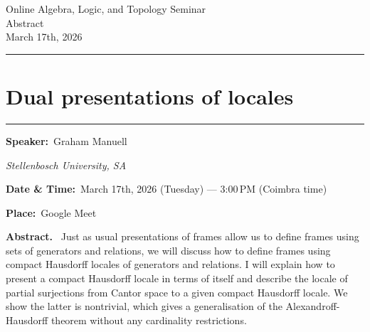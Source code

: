 \documentclass[11pt,a4paper]{article}
\newcommand{\Title}[1]{\section*{#1}\vspace{-0.25em}\hrule\vspace{0.8em}}
\newcommand{\Field}[2]{\textbf{#1:}~#2\par}
\newcommand{\Affil}[1]{\textit{#1}\par}
\newcommand{\Abstract}{\vspace{0.6em}\textbf{Abstract.}~}
\begin{document}
	
	\begin{center}
		{\LARGE Online Algebra, Logic, and Topology Seminar}\\[0.25em]
		{\large Abstract}\\[0.5em]
		March 17th, 2026
	\end{center}
	
	\vspace{1.25em}\hrule\vspace{1.25em}
	
	\Title{Dual presentations of locales}
	
	\Field{Speaker}{Graham Manuell}
	\Affil{\hspace{1.15cm}Stellenbosch University, SA}
	
	\noindent \Field{Date \& Time}{March 17th, 2026 (Tuesday) — 3{:}00\,PM (Coimbra time)}
	\noindent \Field{Place}{Google Meet}
	
	\Abstract
Just as usual presentations of frames allow us to define frames using sets of generators and relations, we will discuss how to define frames using compact Hausdorff locales of generators and relations. I will explain how to present a compact Hausdorff locale in terms of itself and describe the locale of partial surjections from Cantor space to a given compact Hausdorff locale. We show the latter is nontrivial, which gives a generalisation of the Alexandroff-Hausdorff theorem without any cardinality restrictions.
\end{document}
